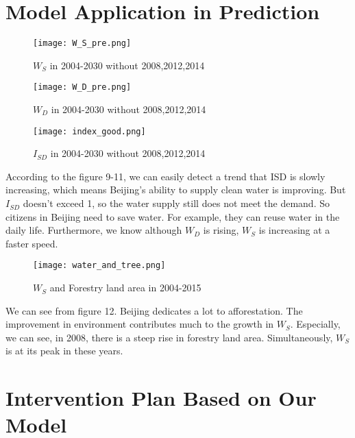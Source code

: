 \documentclass{mcmthesis}
\begin{document}
\section{Model Application in Prediction}

\begin{figure}[htbp]  
\begin{minipage}[t]{0.5\textwidth}
\centering  
\texttt{[image: W\_S\_pre.png]}  
\caption{$W_S$ in 2004-2030 without 2008,2012,2014} 
\end{minipage}
\hspace{1ex}
\begin{minipage}[t]{0.5\textwidth}  
\centering  
\texttt{[image: W\_D\_pre.png]}  
\caption{$W_D$ in 2004-2030 without 2008,2012,2014}  
\end{minipage}  
\end{figure} 

\begin{figure}[h]
\small
\centering
\texttt{[image: index\_good.png]}
\caption{$I_{SD}$ in 2004-2030 without 2008,2012,2014} \label{fig:$I_{SD}$ in 2004-2030}
\end{figure}

\par According to the figure 9-11, we can easily detect a trend that ISD is slowly increasing, which means Beijing’s ability to supply clean water is improving. But $I_{SD}$ doesn’t exceed 1, so the water supply still does not meet the demand. So citizens in Beijing need to save water. For example, they can reuse water in the daily life. Furthermore, we know although $W_D$ is rising, $W_S$ is increasing at a faster speed. 

\begin{figure}[h]
\small
\centering
\texttt{[image: water\_and\_tree.png]}
\caption{$W_S$ and Forestry land area in 2004-2015} \label{fig:$W_S$ and Forestry}
\end{figure}

\par We can see from figure 12. Beijing dedicates a lot to afforestation. The improvement in environment contributes much to the growth in $W_S$. Especially, we can see, in 2008, there is a steep rise in forestry land area. Simultaneously, $W_S$ is at its peak in these years.





\newpage
\section{Intervention Plan Based on Our Model}
\end{document}
